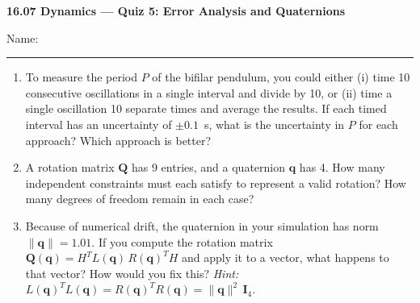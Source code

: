 \documentclass[11pt,letterpaper]{article}
\begin{document}
\begin{center}
    {\Large \textbf{16.07 Dynamics --- Quiz 5: Error Analysis and Quaternions}}
\end{center}

\vspace{4pt}

Name: \rule{3.2in}{0.4pt}

\vspace{14pt}
\begin{enumerate}[label=\textbf{\arabic*.}, leftmargin=*, itemsep=4pt, series=quiz]

\item To measure the period $P$ of the bifilar pendulum, you could either (i) time 10 consecutive oscillations in a single interval and divide by 10, or (ii) time a single oscillation 10 separate times and average the results. If each timed interval has an uncertainty of $\pm 0.1$~s, what is the uncertainty in $P$ for each approach? Which approach is better?
\vspace{2.0in}

\item A rotation matrix $\mathbf{Q}$ has 9 entries, and a quaternion $\mathbf{q}$ has 4. How many independent constraints must each satisfy to represent a valid rotation? How many degrees of freedom remain in each case?
\vspace{2.0in}

\item Because of numerical drift, the quaternion in your simulation has norm $\lVert\mathbf{q}\rVert = 1.01$. If you compute the rotation matrix $\mathbf{Q}(\mathbf{q}) = H^{T}L(\mathbf{q})\,R(\mathbf{q})^{T}H$ and apply it to a vector, what happens to that vector? How would you fix this? \emph{Hint:} $L(\mathbf{q})^{T}L(\mathbf{q}) = R(\mathbf{q})^{T}R(\mathbf{q}) = \lVert\mathbf{q}\rVert^2\,\mathbf{I}_4$.
\vspace*{\fill}

\end{enumerate}
\end{document}
